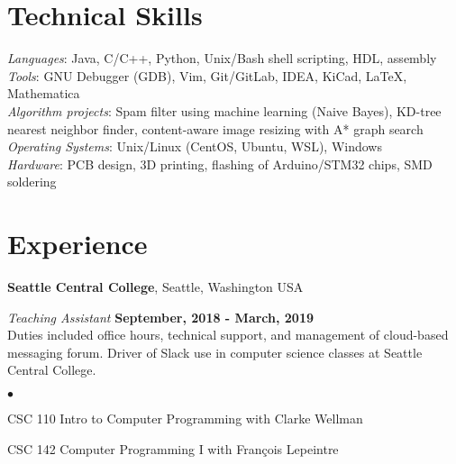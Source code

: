 \documentclass[margin,line]{res}
\newenvironment{list2}{
  \begin{list}{$\bullet$}{%
      \setlength{\itemsep}{0in}
      \setlength{\parsep}{0in} \setlength{\parskip}{0in}
      \setlength{\topsep}{0in} \setlength{\partopsep}{0in} 
      \setlength{\leftmargin}{0.2in}}}{\end{list}}
\begin{document}
\begin{resume}
\section{\sc Technical Skills} 
	{\em Languages}:  
	Java, C/C++, Python, Unix/Bash shell scripting, HDL, assembly
	\\
	{\em Tools}:  
	GNU Debugger (GDB), Vim, Git/GitLab, IDEA, KiCad, \LaTeX, Mathematica 
	\\
	{\em Algorithm projects}: 
	Spam filter using machine learning (Naive Bayes), KD-tree
	nearest neighbor finder, content-aware image resizing with A* graph search
	\\
	{\em Operating Systems}:  
	Unix/Linux (CentOS, Ubuntu, WSL), Windows
	\\
	{\em Hardware}:  PCB design, 3D printing, flashing of Arduino/STM32 chips, SMD soldering
	\\


\vspace{-.3cm}
\section{\sc Experience}


{\bf Seattle Central College}, Seattle, Washington USA

\vspace{-.3cm}
{\em Teaching Assistant} \hfill {\bf September, 2018  - March, 2019}\\
Duties included office hours, technical support, and management of cloud-based messaging forum. 
  Driver of Slack use in computer science classes at Seattle Central College.
\begin{list2}
\item CSC 110 Intro to Computer Programming with Clarke Wellman
\item CSC 142 Computer Programming I with François Lepeintre
\end{list2}     


\end{resume}
\end{document}
